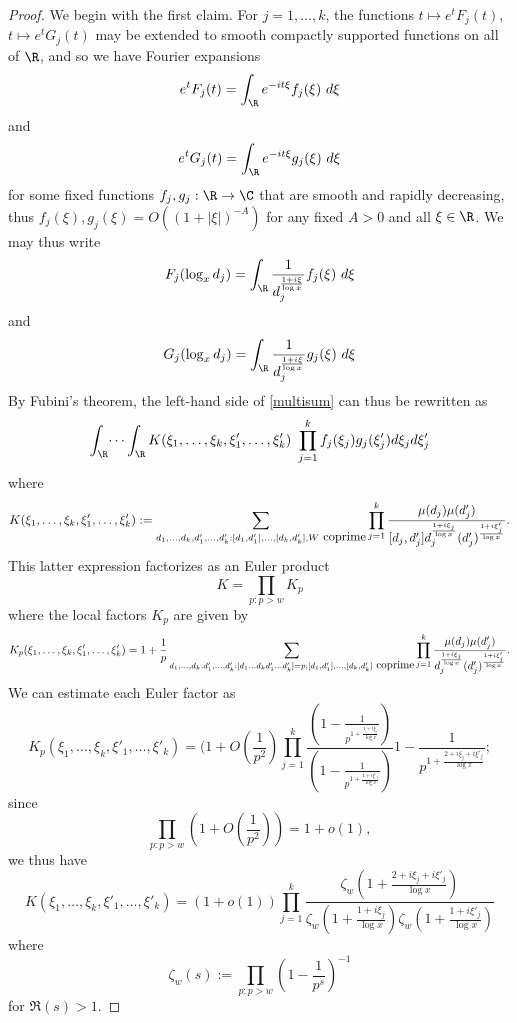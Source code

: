 \begin{proof}  We begin with the first claim.
For $j=1,\dots,k$, the functions $t \mapsto e^t F_j(t)$, $t \mapsto e^t G_j(t)$ may be extended to smooth compactly supported functions on all of $\R$, and so we have Fourier expansions
\begin{equation}\label{etf}
 e^t F_j(t) = \int_\R e^{-it\xi} f_j(\xi)\ d\xi
\end{equation}
and
$$ e^t G_j(t) = \int_\R e^{-it\xi} g_j(\xi)\ d\xi$$
for some fixed functions $f_j, g_j: \R \to \C$ that are smooth and rapidly decreasing, thus $f_j(\xi), g_j(\xi) = O( (1+|\xi|)^{-A} )$ for any fixed $A>0$ and all $\xi \in \R$.  We may thus write
$$ F_j( \log_x d_j ) = \int_\R \frac{1}{d_j^{\frac{1+i\xi}{\log x}}} f_j(\xi)\ d\xi$$
and
$$ G_j( \log_x d_j ) = \int_\R \frac{1}{d_j^{\frac{1+i\xi}{\log x}}} g_j(\xi)\ d\xi$$
By Fubini's theorem, the left-hand side of \eqref{multisum} can thus be rewritten as
\begin{equation}\label{fg-int}
 \int_\R \dots \int_\R K(\xi_1,\dots,\xi_k,\xi'_1,\dots,\xi'_k)\ \prod_{j=1}^k f_j(\xi_j) g_j(\xi'_j) d\xi_j d\xi'_j
\end{equation}
where
$$ K(\xi_1,\dots,\xi_k,\xi'_1,\dots,\xi'_k) := 
\sum_{d_1,\dots,d_k,d'_1,\dots,d'_k: [d_1,d'_1],\dots,[d_k,d'_k],W \hbox{ coprime}} \prod_{j=1}^k \frac{\mu(d_j) \mu(d'_j)}{[d_j,d'_j] d_j^{\frac{1+i\xi_j}{\log x}} (d'_j)^{\frac{1+i\xi'_j}{\log x}}}.$$
This latter expression factorizes as an Euler product 
$$ K = \prod_{p: p>w} K_p$$
where the local factors $K_p$ are given by
\begin{equation}\label{kp}
 K_p(\xi_1,\dots,\xi_k,\xi'_1,\dots,\xi'_k) = 1 + \frac{1}{p}
\sum_{d_1,\dots,d_k,d'_1,\dots,d'_k: [d_1 \dots d_k d'_1 \dots d'_k]=p; [d_1,d'_1],\dots,[d_k,d'_k] \hbox{ coprime}} \prod_{j=1}^k \frac{\mu(d_j) \mu(d'_j)}{d_j^{\frac{1+i\xi_j}{\log x}} (d'_j)^{\frac{1+i\xi'_j}{\log x}}}.
\end{equation}
We can estimate each Euler factor as
\begin{equation}\label{kp-est}
 K_p(\xi_1,\dots,\xi_k,\xi'_1,\dots,\xi'_k) = (1+O(\frac{1}{p^2}) \prod_{j=1}^k \frac{(1 - \frac{1}{p^{1+\frac{1+i\xi_j}{\log x}}})}{(1 - \frac{1}{p^{1+\frac{1+i\xi'_j}{\log x}}})}{1 - \frac{1}{p^{1+\frac{2+i\xi_j+i\xi'_j}{\log x}}}};
\end{equation}
since 
$$ 
\prod_{p: p>w} (1 + O(\frac{1}{p^2})) = 1 + o(1),$$
we thus have
$$
 K(\xi_1,\dots,\xi_k,\xi'_1,\dots,\xi'_k) = (1+o(1)) \prod_{j=1}^k \frac{ \zeta_w( 1 + \frac{2+i\xi_j+i\xi'_j}{\log x}) }{ \zeta_w(1 + \frac{1+i\xi_j}{\log x}) \zeta_w(1 + \frac{1+i\xi'_j}{\log x}) } $$
where
$$ \zeta_w(s) := \prod_{p: p>w} \left(1-\frac{1}{p^s}\right)^{-1}$$
for $\Re(s) > 1$.  


\end{proof}
